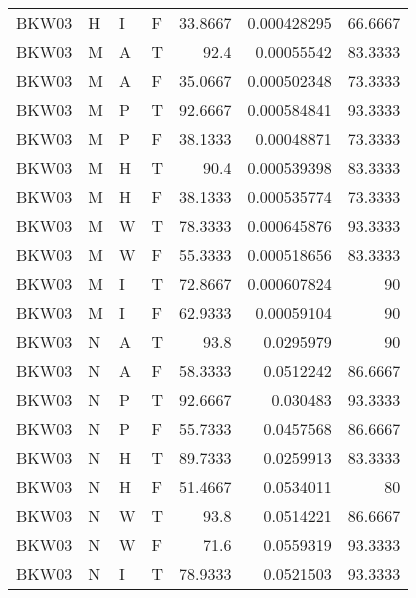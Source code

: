 \begin{longtable}{llllrrr}
    BKW03    & H         & I         & F          & 33.8667    & 0.000428295 & 66.6667  \\
    BKW03    & M         & A         & T          & 92.4       & 0.00055542  & 83.3333  \\
    BKW03    & M         & A         & F          & 35.0667    & 0.000502348 & 73.3333  \\
    BKW03    & M         & P         & T          & 92.6667    & 0.000584841 & 93.3333  \\
    BKW03    & M         & P         & F          & 38.1333    & 0.00048871  & 73.3333  \\
    BKW03    & M         & H         & T          & 90.4       & 0.000539398 & 83.3333  \\
    BKW03    & M         & H         & F          & 38.1333    & 0.000535774 & 73.3333  \\
    BKW03    & M         & W         & T          & 78.3333    & 0.000645876 & 93.3333  \\
    BKW03    & M         & W         & F          & 55.3333    & 0.000518656 & 83.3333  \\
    BKW03    & M         & I         & T          & 72.8667    & 0.000607824 & 90       \\
    BKW03    & M         & I         & F          & 62.9333    & 0.00059104  & 90       \\
    BKW03    & N         & A         & T          & 93.8       & 0.0295979   & 90       \\
    BKW03    & N         & A         & F          & 58.3333    & 0.0512242   & 86.6667  \\
    BKW03    & N         & P         & T          & 92.6667    & 0.030483    & 93.3333  \\
    BKW03    & N         & P         & F          & 55.7333    & 0.0457568   & 86.6667  \\
    BKW03    & N         & H         & T          & 89.7333    & 0.0259913   & 83.3333  \\
    BKW03    & N         & H         & F          & 51.4667    & 0.0534011   & 80       \\
    BKW03    & N         & W         & T          & 93.8       & 0.0514221   & 86.6667  \\
    BKW03    & N         & W         & F          & 71.6       & 0.0559319   & 93.3333  \\
    BKW03    & N         & I         & T          & 78.9333    & 0.0521503   & 93.3333  \\

\end{longtable}
